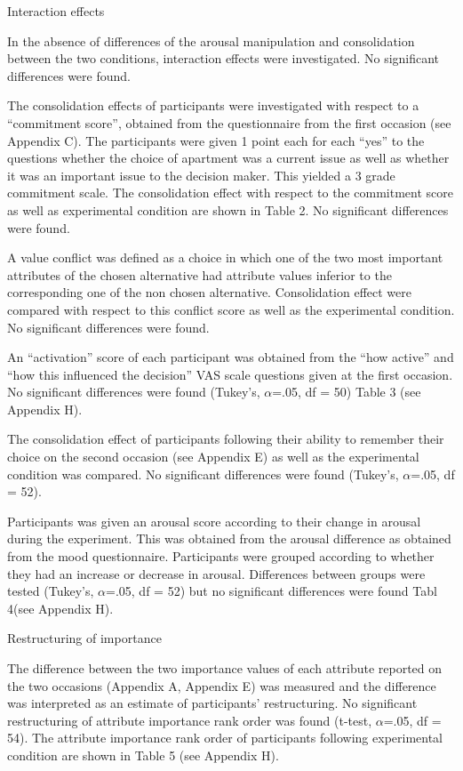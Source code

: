 \documentclass[jou,11pt]{apa6}
\begin{document}
Interaction effects

In the absence of differences of the arousal manipulation and
consolidation between the two conditions, interaction effects were
investigated. No significant differences were found.

The consolidation effects of participants were investigated with
respect to a ``commitment score'', obtained from the questionnaire from
the first occasion (see Appendix C). The participants were given 1
point each for each ``yes'' to the questions whether the choice of
apartment was a current issue as well as whether it was an important
issue to the decision maker. This yielded a 3 grade commitment scale.
The consolidation effect with respect to the commitment score as well
as experimental condition are shown in Table 2. No significant
differences were found.

A value conflict was defined as a choice in which one of the two most
important attributes of the chosen alternative had attribute values
inferior to the corresponding one of the non chosen
alternative. Consolidation effect were compared with respect to this
conflict score as well as the experimental condition. No significant
differences were found.

An ``activation'' score of each participant was obtained from the ``how
active'' and ``how this influenced the decision'' VAS scale questions
given at the first occasion.   No significant differences were found
(Tukey's, $\alpha$=.05, df = 50) Table 3 (see Appendix H).

The consolidation effect of participants following their ability to
remember their choice on the second occasion (see Appendix E) as well
as the experimental condition was compared.   No significant
differences were found (Tukey's, $\alpha$=.05, df = 52).

Participants was given an arousal score according to their change in
arousal during the experiment. This was obtained from the arousal
difference as obtained from the mood questionnaire.  Participants were
grouped according to whether they had an increase or decrease in
arousal.  Differences between groups were tested (Tukey's, $\alpha$=.05, df =
52) but no significant differences were found Tabl 4(see Appendix H).


Restructuring of importance 

The difference between the two importance values of each attribute
reported on the two occasions (Appendix A, Appendix E) was measured
and the difference was interpreted as an estimate of participants'
restructuring. No significant restructuring  of attribute importance
rank order was found (t-test, $\alpha$=.05, df = 54).  The attribute
importance rank order of participants following experimental condition
are shown in Table 5 (see Appendix H).
\end{document}
